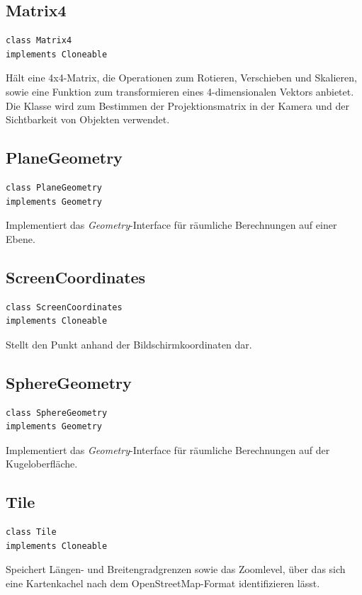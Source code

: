\documentclass[10pt]{scrreprt}
\begin{document}
\vspace{5mm}
\subsection*{Matrix4}
\begin{lstlisting}
class Matrix4
implements Cloneable
\end{lstlisting}
Hält eine 4x4-Matrix, die Operationen zum Rotieren, Verschieben und Skalieren, sowie eine Funktion zum transformieren eines 4-dimensionalen Vektors anbietet. Die Klasse wird zum Bestimmen der Projektionsmatrix in der Kamera und der Sichtbarkeit von Objekten verwendet.\\

\vspace{5mm}
\subsection*{PlaneGeometry}
\begin{lstlisting}
class PlaneGeometry
implements Geometry
\end{lstlisting}
Implementiert das \textit{Geometry}-Interface für räumliche Berechnungen auf einer Ebene.\\

\vspace{5mm}
\subsection*{ScreenCoordinates}
\begin{lstlisting}
class ScreenCoordinates
implements Cloneable
\end{lstlisting}
Stellt den Punkt anhand der Bildschirmkoordinaten dar.\\

\vspace{5mm}
\subsection*{SphereGeometry}
\begin{lstlisting}
class SphereGeometry
implements Geometry
\end{lstlisting}
Implementiert das \textit{Geometry}-Interface für räumliche Berechnungen auf der Kugeloberfläche.\\

\vspace{5mm}
\subsection*{Tile}
\begin{lstlisting}
class Tile 
implements Cloneable
\end{lstlisting}
Speichert Längen- und Breitengradgrenzen sowie das Zoomlevel, über das sich eine Kartenkachel nach dem OpenStreetMap-Format identifizieren lässt.\\
\end{document}
